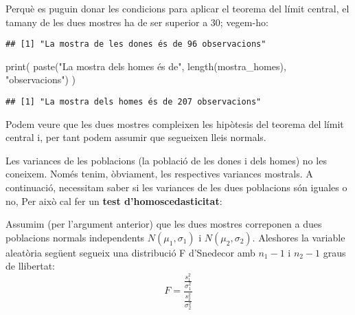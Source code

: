 \documentclass[
]{article}
\newenvironment{Shaded}{\begin{snugshade}}{\end{snugshade}}
\newcommand{\FunctionTok}[1]{\textcolor[rgb]{0.94,0.94,0.56}{#1}}
\newcommand{\NormalTok}[1]{\textcolor[rgb]{0.80,0.80,0.80}{#1}}
\newcommand{\OtherTok}[1]{\textcolor[rgb]{0.94,0.94,0.56}{#1}}
\newcommand{\SpecialCharTok}[1]{\textcolor[rgb]{0.86,0.64,0.64}{#1}}
\newcommand{\StringTok}[1]{\textcolor[rgb]{0.80,0.58,0.58}{#1}}
\begin{document}
Perquè es puguin donar les condicions para aplicar el teorema del límit
central, el tamany de les dues mostres ha de ser superior a 30;
vegem-ho:

\begin{Shaded}
\end{Shaded}

\begin{verbatim}
## [1] "La mostra de les dones és de 96 observacions"
\end{verbatim}

\begin{Shaded}
\begin{Highlighting}[]
\FunctionTok{print}\NormalTok{( }\FunctionTok{paste}\NormalTok{(}\StringTok{"La mostra dels homes és de"}\NormalTok{, }\FunctionTok{length}\NormalTok{(mostra\_homes), }\StringTok{"observacions"}\NormalTok{) )}
\end{Highlighting}
\end{Shaded}

\begin{verbatim}
## [1] "La mostra dels homes és de 207 observacions"
\end{verbatim}

Podem veure que les dues mostres compleixen les hipòtesis del teorema
del límit central i, per tant podem assumir que segueixen lleis normals.

Les variances de les poblacions (la població de les dones i dels homes)
no les coneixem. Només tenim, òbviament, les respectives variances
mostrals. A continuació, necessitam saber si les variances de les dues
poblacions són iguales o no, Per això cal fer un \textbf{test
d'homoscedasticitat}:

Assumim (per l'argument anterior) que les dues mostres correponen a dues
poblacions normals independents \(N(\mu_{1},\sigma_{1})\) i
\(N(\mu_{2},\sigma_{2})\). Aleshores la variable aleatòria següent
segueix una distribució F d'Snedecor amb \(n_1-1\) i \(n_2-1\) graus de
llibertat:
\[ F=\frac{\frac{s_{1}^{2}}{\sigma_{1}^{2}}}{\frac{s_{2}^{2}}{\sigma_{2}^{2}}}  \]
\end{document}
